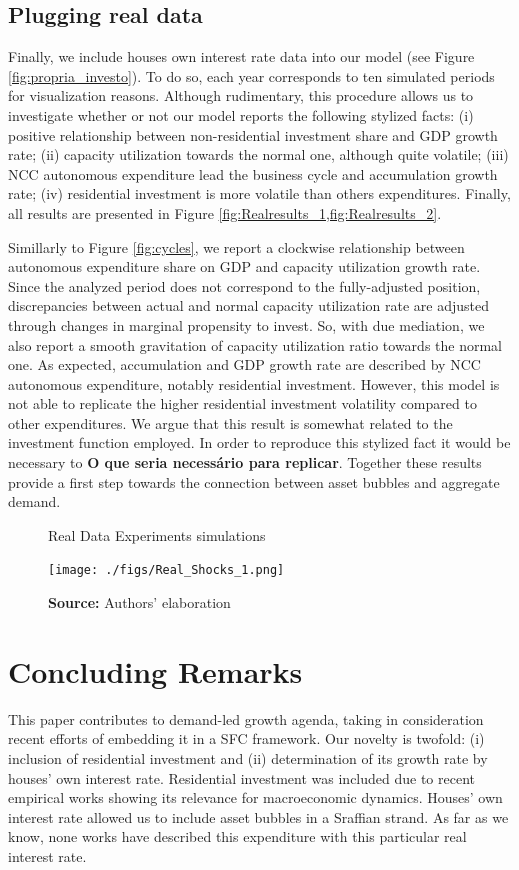 \documentclass[11pt]{article}
\begin{document}
\subsection{Plugging real data}
\label{sec:org50b2d26}


Finally, we include houses own interest rate data into our model (see Figure \ref{fig:propria_investo}).
To do so, each year corresponds to ten simulated periods for visualization reasons.
Although rudimentary, this procedure allows us to investigate whether or not our model reports the following stylized facts:
(i) positive relationship between non-residential investment share and GDP growth rate; (ii) capacity utilization towards the normal one, although quite volatile; (iii) NCC autonomous expenditure lead the business cycle and accumulation growth rate; (iv) residential investment is more volatile than others expenditures.
Finally, all results are presented in Figure \ref{fig:Realresults_1,fig:Realresults_2}.

Simillarly to Figure \ref{fig:cycles}, we report a clockwise relationship between autonomous expenditure share on GDP and capacity utilization growth rate.
Since the analyzed period does not correspond to the fully-adjusted position, discrepancies between actual and normal capacity utilization rate are adjusted through changes in marginal propensity to invest.
So, with due mediation, we also report a smooth gravitation of capacity utilization ratio towards the normal one.
As expected, accumulation and GDP growth rate are described by NCC autonomous expenditure, notably residential investment. 
However, this model is not able to replicate the higher residential investment volatility compared to other expenditures.
We argue that this result is somewhat related to the investment function employed. In order to reproduce this stylized fact it would be necessary to \textbf{O que seria necessário para replicar}.
Together these results provide a first step towards the connection between asset bubbles and aggregate demand.



\begin{figure}[htb]
	\centering
	\caption{Real Data Experiments simulations}
	\label{fig:Realresults_1}
	\texttt{[image: ./figs/Real\_Shocks\_1.png]}
	\caption*{\textbf{Source:} Authors' elaboration}
\end{figure}



\section{Concluding Remarks}
\label{sec:org9d7c26c}
\label{sec:Conclusion}
This paper contributes to demand-led growth agenda, taking in consideration recent efforts of embedding it in a SFC framework.
Our novelty is twofold: (i) inclusion of residential investment and (ii) determination of its growth rate by houses' own interest rate.
Residential investment was included due to recent empirical works showing its relevance for macroeconomic dynamics.
Houses' own interest rate allowed us to include asset bubbles in a Sraffian strand.
As far as we know, none works have described this expenditure with this particular real interest rate.
\end{document}
